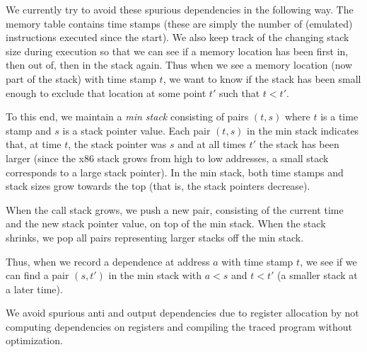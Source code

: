 We currently try to avoid these spurious dependencies in the following
way. The memory table contains time stamps (these are simply the
number of (emulated) instructions executed since the start). We also
keep track of the changing stack size during execution so that we can
see if a memory location has been first in, then out of, then in the
stack again. Thus when we see a memory location (now part of the
stack) with time stamp $t$, we want to know if the stack has been
small enough to exclude that location at some point $t'$ such that 
$t<t'$. 

To this end, we maintain a {\em min stack} consisting of pairs $(t,s)$
where $t$ is a time stamp and $s$ is a stack pointer value. Each pair
$(t,s)$ in the min stack indicates that, at time $t$, the stack
pointer was $s$ and at all times $t'$ the stack has been larger (since
the x86 stack grows from high to low addresses, a small stack
corresponds to a large stack pointer). In the min stack, both
time stamps and stack sizes grow towards the top (that is, the stack
pointers decrease).

When the
call stack grows, we push a new pair, consisting of the current time
and the new stack pointer value, on top of the min stack. When the
stack shrinks, we pop all pairs representing larger stacks off the min
stack.

Thus, when we record a dependence at address $a$ with time stamp $t$,
we see if we can find a pair $(s,t')$ in the min stack with $a<s$ and
$t<t'$ (a smaller stack at a later time).

We avoid spurious anti and output dependencies due to register
allocation by not computing dependencies on registers and compiling
the traced program without optimization. 
